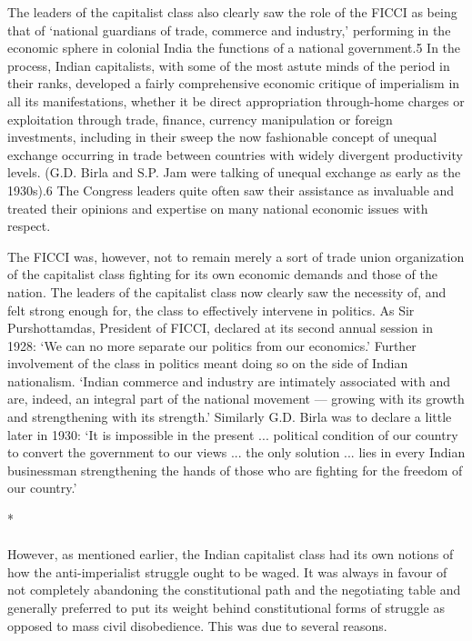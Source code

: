 The leaders of the capitalist class also clearly saw the role of the FICCI as being that of `national guardians of trade, commerce and industry,' performing in the economic sphere in colonial India the functions of a national government.5 In the process, Indian capitalists, with some of the most astute minds of the period in their ranks, developed a fairly comprehensive economic critique of imperialism in all its manifestations, whether it be direct appropriation through-home charges or exploitation through trade, finance, currency manipulation or foreign investments, including in their sweep the now fashionable concept of unequal exchange occurring in trade between countries with widely divergent productivity levels. (G.D. Birla and S.P. Jam were talking of unequal exchange as early as the 1930s).6 The Congress leaders quite often saw their assistance as invaluable and treated their opinions and expertise on many national economic issues with respect. 

The FICCI was, however, not to remain merely a sort of trade union organization of the capitalist class fighting for its own economic demands and those of the nation. The leaders of the capitalist class now clearly saw the necessity of, and felt strong enough for, the class to effectively intervene in politics. As Sir Purshottamdas, President of FICCI, declared at its second annual session in 1928: `We can no more separate our politics from our economics.' Further involvement of the class in politics meant doing so on the side of Indian nationalism. `Indian commerce and industry are intimately associated with and are, indeed, an integral part of the national movement --- growing with its growth and strengthening with its strength.' Similarly G.D. Birla was to declare a little later in 1930: `It is impossible in the present ... political condition of our country to convert the government to our views ... the only solution ... lies in every Indian businessman strengthening the hands of those who are fighting for the freedom of our country.'

\begin{center}*\end{center}

\paragraph*{}

However, as mentioned earlier, the Indian capitalist class had its own notions of how the anti-imperialist struggle ought to be waged. It was always in favour of not completely abandoning the constitutional path and the negotiating table and generally preferred to put its weight behind constitutional forms of struggle as opposed to mass civil disobedience. This was due to several reasons. 

